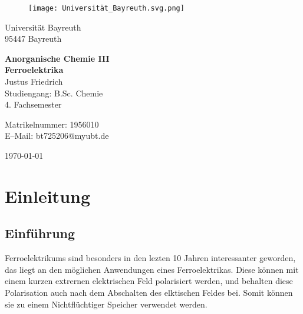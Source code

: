 \documentclass[12pt, a4paper]{article}
\begin{document}
\begin{figure}
    \texttt{[image: Universität\_Bayreuth.svg.png]}
\end{figure}



{\raggedright Universität Bayreuth\\  95447 Bayreuth}


\vspace{5cm}

\begin{center}
{\LARGE\bf{Anorganische Chemie III}} \\  
\vspace{1cm}
{\Large\bf{Ferroelektrika}}\\
\vspace{0.5cm}
{\large Justus Friedrich\\}
{Studiengang: B.Sc. Chemie\\}
{4. Fachsemester}
\end{center}





\thispagestyle{empty}
\begin{center}
{\small Matrikelnummer: 1956010 \\
E–Mail:  bt725206@myubt.de}
\end{center}

\vspace{5cm}

\begin{center}
  \today
\end{center}


\newpage
\tableofcontents
\thispagestyle{empty}


\newpage
\setcounter{page}{1}
\section{Einleitung}



\subsection{Einführung}
Ferroelektrikums sind besonders in den lezten 10 Jahren interessanter geworden, 
das liegt an den möglichen Anwendungen eines Ferroelektrikas. Diese können mit einem kurzen 
extrernen elektrischen Feld polarisiert werden, und behalten diese Polarisation auch nach dem Abschalten 
des elktischen Feldes bei. Somit können sie zu einem Nichtflüchtiger Speicher verwendet werden.\cite{Damjanovic.1998}
\end{document}
